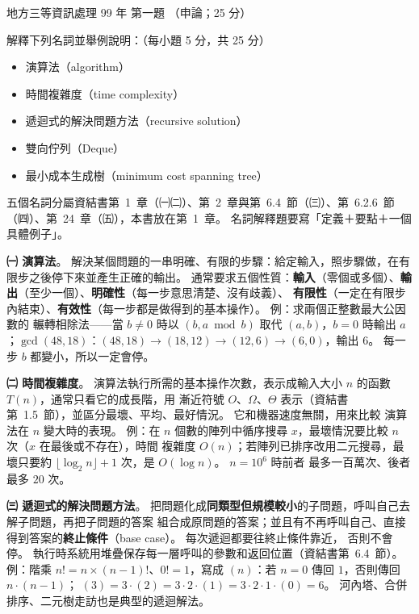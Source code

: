 \begin{pastexam}[label={px:df3-099-ds-01}]{地方三等資訊處理 99 年 第一題}
（申論；25 分）

解釋下列名詞並舉例說明：（每小題 5 分，共 25 分）
\begin{itemize}[leftmargin=2.2em]
\item[㈠] 演算法（algorithm）
\item[㈡] 時間複雜度（time complexity）
\item[㈢] 遞迴式的解決問題方法（recursive solution）
\item[㈣] 雙向佇列（Deque）
\item[㈤] 最小成本生成樹（minimum cost spanning tree）
\end{itemize}
\end{pastexam}

\begin{pastsoln}
五個名詞分屬資結書第~1~章（㈠㈡）、第~2~章與第~6.4~節（㈢）、第~6.2.6~節（㈣）、第~24~章（㈤），本書放在第~1~章。
名詞解釋題要寫「定義＋要點＋一個具體例子」。

\textbf{㈠ 演算法}。 解決某個問題的一串明確、有限的步驟：給定輸入，照步驟做，在有限步之後停下來並產生正確的輸出。
通常要求五個性質：\textbf{輸入}（零個或多個）、\textbf{輸出}（至少一個）、\textbf{明確性}（每一步意思清楚、沒有歧義）、
\textbf{有限性}（一定在有限步內結束）、\textbf{有效性}（每一步都是做得到的基本操作）。 例：求兩個正整數最大公因數的
輾轉相除法——當 $b \ne 0$ 時以 $(b, a \bmod b)$ 取代 $(a, b)$，$b = 0$ 時輸出 $a$；$\gcd(48, 18)$：$(48, 18) \to (18, 12)
\to (12, 6) \to (6, 0)$，輸出 $6$。 每一步 $b$ 都變小，所以一定會停。

\textbf{㈡ 時間複雜度}。 演算法執行所需的基本操作次數，表示成輸入大小 $n$ 的函數 $T(n)$，通常只看它的成長階，用
漸近符號 $O$、$\Omega$、$\Theta$ 表示（資結書第~1.5~節），並區分最壞、平均、最好情況。 它和機器速度無關，用來比較
演算法在 $n$ 變大時的表現。 例：在 $n$ 個數的陣列中循序搜尋 $x$，最壞情況要比較 $n$ 次（$x$ 在最後或不存在），時間
複雜度 $O(n)$；若陣列已排序改用二元搜尋，最壞只要約 $\lfloor \log_2 n \rfloor + 1$ 次，是 $O(\log n)$。 $n = 10^6$ 時前者
最多一百萬次、後者最多 $20$ 次。

\textbf{㈢ 遞迴式的解決問題方法}。 把問題化成\textbf{同類型但規模較小}的子問題，呼叫自己去解子問題，再把子問題的答案
組合成原問題的答案；並且有不再呼叫自己、直接得到答案的\textbf{終止條件}（base case）。 每次遞迴都要往終止條件靠近，
否則不會停。 執行時系統用堆疊保存每一層呼叫的參數和返回位置（資結書第~6.4~節）。 例：階乘
$n! = n \times (n-1)!$、$0! = 1$，寫成 $(n)$：若 $n = 0$ 傳回 $1$，否則傳回 $n \cdot$$(n-1)$；
$(3) = 3 \cdot$$(2) = 3 \cdot 2 \cdot$$(1) = 3 \cdot 2 \cdot 1 \cdot$$(0) = 6$。
河內塔、合併排序、二元樹走訪也是典型的遞迴解法。


\end{pastsoln}
